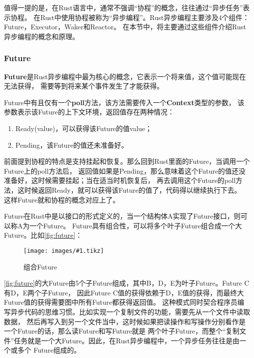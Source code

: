 \documentclass[supercite]{HustGraduPaper}
\newcommand{\cfig}[3]{
  \begin{figure}[htb]
    \centering
    \texttt{[image: images/\#1.tikz]}
    \caption{#3}
    \label{fig:#1}
  \end{figure}
}
\newcommand{\rfig}[1]{\autoref{fig:#1}}
\theoremstyle{definition}
\begin{document}
值得一提的是，在Rust语言中，通常不强调“协程”的概念，往往通过“异步任务”表示协程。
在Rust中使用协程被称为“异步编程”。Rust异步编程主要涉及4个组件：Future，Executor，Waker和Reactor。
在本节中，将主要通过这些组件介绍Rust异步编程的概念和原理。\par

\subsubsection{Future}
\textbf{Future}是Rust异步编程中最为核心的概念，它表示一个将来值，这个值可能现在无法获得，
需要等到将来某个事件发生了才能获得。\par

Future中有且仅有一个\textbf{poll}方法，该方法需要传入一个\textbf{Context}类型的参数，
该参数表示该Future的上下文环境，返回值存在两种情况：

\begin{enumerate}[label={(\arabic*)}]
  \item Ready(value)，可以获得该Future的值value；
  \item Pending，该Future的值还未准备好。
\end{enumerate}

前面提到协程的特点是支持挂起和恢复。那么回到Rust里面的Future，当调用一个Future上的poll方法后，
返回值如果是Pending，那么意味着这个Future的值还没准备好，这时候需要挂起；当在适当时机恢复后，
再去调用这个Future的poll方法，这时候返回Ready，就可以获得该Future的值了，代码得以继续执行下去。
这样Future就和协程的概念对应上了。\par


Future在Rust中是以接口的形式定义的，当一个结构体A实现了Future接口，则可以称A为一个Future。
Future具有组合性，可以将多个叶子Future组合成一个大Future。比如\rfig{future}：

\cfig{future}{0.4}{组合Future}

\rfig{future}的大Future由5个子Future组成，其中B，D，E为叶子Future。Future C有D，E两个子Future，
因此Future C值的获得依赖于D，E值的获得，而最终大Future值的获得需要图中所有Future都获得返回值。
这种模式同时契合程序员编写异步代码的思维习惯。比如实现一个复制文件的功能，需要先从一个文件中读取数据，
然后再写入到另一个文件当中，这时候如果把读操作和写操作分别看作是一个Future的话，那么读Future和写Future就是
两个叶子Future，而整个“复制文件”任务就是一个大Future。因此，在Rust异步编程中，一个异步任务往往是由一个或多个
Future组成的。\par
\end{document}
